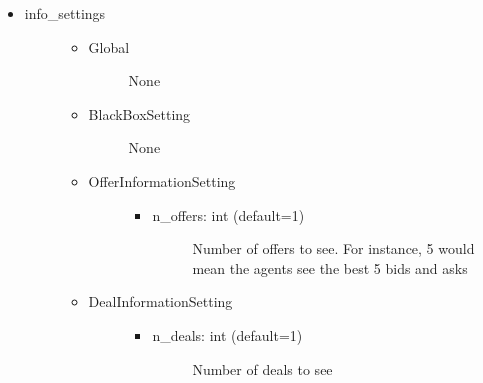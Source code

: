 \documentclass[letterpaper,10pt,english]{sphinxmanual}
\begin{document}
\begin{itemize}
\begin{description}
\begin{itemize}
\begin{description}
\begin{itemize}
\begin{description}
\end{description}

\end{itemize}

\end{description}

\item {} \begin{description}
\item[{info\_settings}] \leavevmode\begin{itemize}
\item {} \begin{description}
\item[{Global}] \leavevmode
\sphinxAtStartPar
None

\end{description}

\item {} \begin{description}
\item[{BlackBoxSetting}] \leavevmode
\sphinxAtStartPar
None

\end{description}

\item {} \begin{description}
\item[{OfferInformationSetting}] \leavevmode\begin{itemize}
\item {} \begin{description}
\item[{n\_offers: int (default=1)}] \leavevmode
\sphinxAtStartPar
Number of offers to see. For instance, 5 would mean the agents see the best 5 bids and asks

\end{description}

\end{itemize}

\end{description}

\item {} \begin{description}
\item[{DealInformationSetting}] \leavevmode\begin{itemize}
\item {} \begin{description}
\item[{n\_deals: int (default=1)}] \leavevmode
\sphinxAtStartPar
Number of deals to see


\end{description}
\end{itemize}
\end{description}
\end{itemize}
\end{description}
\end{itemize}
\end{description}
\end{itemize}
\end{document}

